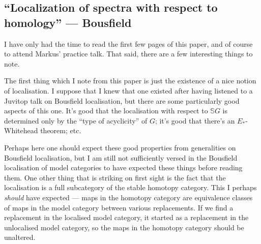 \documentclass[11pt]{article}
\newcommand{\KanSemResponse}[1]
{
\thispagestyle{fancy}
\section{#1}
}
\begin{document}
\begin{BousfieldLoc}
\KanSemResponse
{``Localization of spectra with respect to homology'' --- Bousfield}
I have only had the time to read the first few pages of this paper, and of course to attend Markus' practice talk. That said, there are a few interesting things to note.

The first thing which I note from this paper is just the existence of a nice notion of localisation. I suppose that I knew that one existed after having listened to a Juvitop talk on Bousfield localisation, but there are some particularly good aspects of this one. It's good that the localisation with respect to $\mathbb{S}G$ is determined only by the ``type of acyclicity'' of $G$; it's good that there's an $E_*$-Whitehead theorem; etc.

Perhaps here one should expect these good properties from generalities on Bousfield localisation, but I am still not sufficiently versed in the Bousfield localisation of model categories to have expected these things before reading them. One other thing that is striking on first sight is the fact that the localisation is a full subcategory of the stable homotopy category. This I perhaps \emph{should} have expected --- maps in the homotopy category are equivalence classes of maps in the model category between various replacements. If we find a replacement in the localised model category, it started as a replacement in the unlocalised model category, so the maps in the homotopy category should be unaltered.

\pagebreak

\end{BousfieldLoc}
\end{document}
